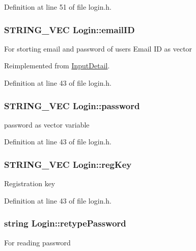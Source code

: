 \-Definition at line 51 of file login.\-h.

\hypertarget{classLogin_abea56d6d6403f1e627294f222dd77310}{
\subsubsection[{email\-I\-D}]{\setlength{\rightskip}{0pt plus 5cm}\-S\-T\-R\-I\-N\-G\-\_\-\-V\-E\-C {\bf \-Login\-::email\-I\-D}}}\label{classLogin_abea56d6d6403f1e627294f222dd77310}
\-For storting email and password of users \-Email \-I\-D as vector 

\-Reimplemented from \hyperlink{classInputDetail_ad3f1db4fddbe0d4efbf1d5bc74d52257}{\-Input\-Detail}.



\-Definition at line 43 of file login.\-h.

\hypertarget{classLogin_a39f7fd03b2b27c927c657ee73e7fcbbc}{
\subsubsection[{password}]{\setlength{\rightskip}{0pt plus 5cm}\-S\-T\-R\-I\-N\-G\-\_\-\-V\-E\-C {\bf \-Login\-::password}}}\label{classLogin_a39f7fd03b2b27c927c657ee73e7fcbbc}
password as vector variable 

\-Definition at line 43 of file login.\-h.

\hypertarget{classLogin_ae22f0ed73e5248cd71a7b2167676376a}{
\subsubsection[{reg\-Key}]{\setlength{\rightskip}{0pt plus 5cm}\-S\-T\-R\-I\-N\-G\-\_\-\-V\-E\-C {\bf \-Login\-::reg\-Key}}}\label{classLogin_ae22f0ed73e5248cd71a7b2167676376a}
\-Registration key 

\-Definition at line 43 of file login.\-h.

\hypertarget{classLogin_ade36f8943aafce470ef4b8353c79b2c6}{
\subsubsection[{retype\-Password}]{\setlength{\rightskip}{0pt plus 5cm}string {\bf \-Login\-::retype\-Password}}}\label{classLogin_ade36f8943aafce470ef4b8353c79b2c6}
\-For reading password 

